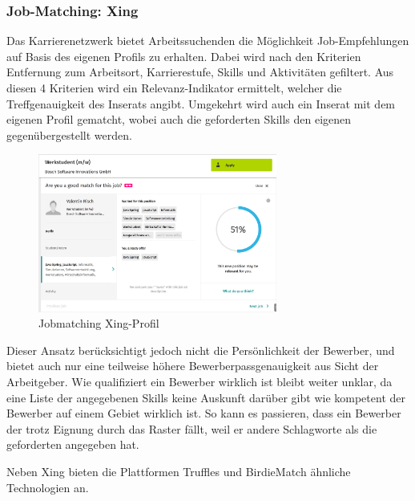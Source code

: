 \subsubsection{Job-Matching: Xing}

Das Karrierenetzwerk bietet Arbeitssuchenden die Möglichkeit Job-Empfehlungen auf Basis des eigenen Profils zu erhalten. Dabei wird nach den Kriterien Entfernung zum Arbeitsort, Karrierestufe, Skills und Aktivitäten gefiltert. Aus diesen 4 Kriterien wird ein Relevanz-Indikator ermittelt, welcher die Treffgenauigkeit des Inserats angibt. Umgekehrt wird auch ein Inserat mit dem eigenen Profil gematcht, wobei auch die geforderten Skills den eigenen gegenübergestellt werden.\cite{hoelscher}

\begin{figure}[htb]
 \centering
 \includegraphics[width=0.7\textwidth,angle=0]{abb/xing_jobmatching}
 \caption[Beschreibung]{Jobmatching Xing-Profil}
\label{fig:Beschreibung}
\end{figure}

Dieser Ansatz berücksichtigt jedoch nicht die Persönlichkeit der Bewerber, und bietet auch nur eine teilweise höhere Bewerberpassgenauigkeit aus Sicht der Arbeitgeber. Wie qualifiziert ein Bewerber wirklich ist bleibt weiter unklar, da eine Liste der angegebenen Skills keine Auskunft darüber gibt wie kompetent der Bewerber auf einem Gebiet wirklich ist. So kann es passieren, dass ein Bewerber der trotz Eignung durch das Raster fällt, weil er andere Schlagworte als die geforderten angegeben hat.

Neben Xing bieten die Plattformen Truffles und BirdieMatch ähnliche Technologien an.




